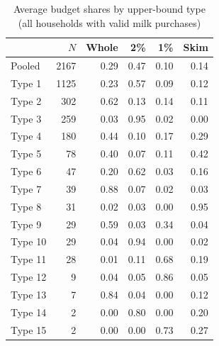 \begin{table}[htbp]
\centering
\caption{Average budget shares by upper-bound type (all households with valid milk purchases)}
\label{tab:groupshares_all}
\begin{tabular}{lrrrrr}
\toprule
 & $N$ & Whole & 2\% & 1\% & Skim \\
\midrule
Pooled & 2167 & 0.29 & 0.47 & 0.10 & 0.14 \\
\midrule
Type 1 & 1125 & 0.23 & 0.57 & 0.09 & 0.12 \\
Type 2 & 302 & 0.62 & 0.13 & 0.14 & 0.11 \\
Type 3 & 259 & 0.03 & 0.95 & 0.02 & 0.00 \\
Type 4 & 180 & 0.44 & 0.10 & 0.17 & 0.29 \\
Type 5 & 78 & 0.40 & 0.07 & 0.11 & 0.42 \\
Type 6 & 47 & 0.20 & 0.62 & 0.03 & 0.16 \\
Type 7 & 39 & 0.88 & 0.07 & 0.02 & 0.03 \\
Type 8 & 31 & 0.02 & 0.03 & 0.00 & 0.95 \\
Type 9 & 29 & 0.59 & 0.03 & 0.34 & 0.04 \\
Type 10 & 29 & 0.04 & 0.94 & 0.00 & 0.02 \\
Type 11 & 28 & 0.01 & 0.11 & 0.68 & 0.19 \\
Type 12 & 9 & 0.04 & 0.05 & 0.86 & 0.05 \\
Type 13 & 7 & 0.84 & 0.04 & 0.00 & 0.12 \\
Type 14 & 2 & 0.00 & 0.80 & 0.00 & 0.20 \\
Type 15 & 2 & 0.00 & 0.00 & 0.73 & 0.27 \\
\bottomrule
\end{tabular}
\end{table}
